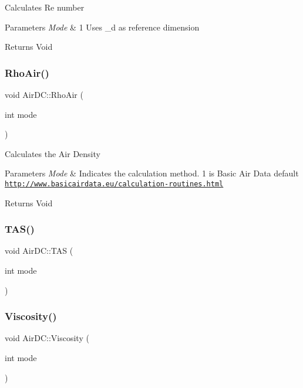 Calculates Re number 
\begin{DoxyParams}{Parameters}
{\em Mode} & 1 Uses \+\_\+d as reference dimension \\
\hline
\end{DoxyParams}
\begin{DoxyReturn}{Returns}
Void 
\end{DoxyReturn}
\mbox{\label{class_air_d_c_a89f74a0f980a2891d10f4e5637ddbc40}} 
\subsubsection{\texorpdfstring{Rho\+Air()}{RhoAir()}}
{\footnotesize\ttfamily void Air\+D\+C\+::\+Rho\+Air (\begin{DoxyParamCaption}\item[{int}]{mode }\end{DoxyParamCaption})}

Calculates the Air Density 
\begin{DoxyParams}{Parameters}
{\em Mode} & Indicates the calculation method. 1 is Basic Air Data default \href{http://www.basicairdata.eu/calculation-routines.html}{\tt http\+://www.\+basicairdata.\+eu/calculation-\/routines.\+html} \\
\hline
\end{DoxyParams}
\begin{DoxyReturn}{Returns}
Void 
\end{DoxyReturn}
\mbox{\label{class_air_d_c_ac5f852dcb7b32bf8b18f8dda9d1e7005}} 
\subsubsection{\texorpdfstring{T\+A\+S()}{TAS()}}
{\footnotesize\ttfamily void Air\+D\+C\+::\+T\+AS (\begin{DoxyParamCaption}\item[{int}]{mode }\end{DoxyParamCaption})}

\mbox{\label{class_air_d_c_a5c6e4f0974dbff73ea1bcdec01309193}} 
\subsubsection{\texorpdfstring{Viscosity()}{Viscosity()}}
{\footnotesize\ttfamily void Air\+D\+C\+::\+Viscosity (\begin{DoxyParamCaption}\item[{int}]{mode }\end{DoxyParamCaption})}

